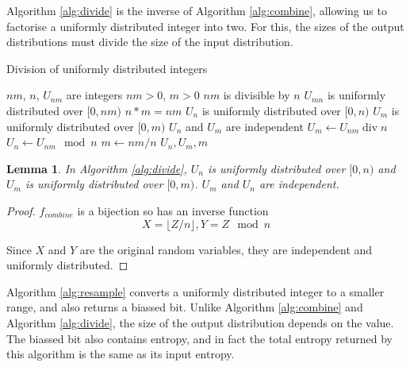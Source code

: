 \documentclass[12pt]{article}
\newtheorem{lemma}{Lemma}
\begin{document}
Algorithm \ref{alg:divide} is the inverse of Algorithm \ref{alg:combine}, allowing us to factorise a uniformly distributed integer into two. For this, the sizes of the output distributions must divide the size of the input distribution.

\begin{algorithm}
\caption{Division of uniformly distributed integers}
\label{alg:divide}
\begin{algorithmic}[1]
    \Require $nm$, $n$, $U_{nm}$ are integers
    \Require $nm>0$, $m>0$
    \Require $nm$ is divisible by $n$
    \Require $U_{mn}$ is uniformly distributed over $[0,nm)$
    \Ensure $n * m = nm$
    \Ensure $U_{n}$ is uniformly distributed over $[0,n)$
    \Ensure $U_{m}$ is uniformly distributed over $[0,m)$
    \Ensure $U_n$ and $U_m$ are independent
  \State $U_m \gets U_{nm} \operatorname{div} n$
  \State $U_{n} \gets U_{nm} \mod n$
  \State $m \gets nm / n$
  \State \Return $U_n, U_m, m$
\EndProcedure
\end{algorithmic}
\end{algorithm}

\begin{lemma}
In Algorithm \ref{alg:divide}, $U_n$ is uniformly distributed over $[0,n)$ and $U_m$ is uniformly distributed over $[0,m)$. $U_m$ and $U_n$ are independent.

\label{lem:divide}
\end{lemma}

\begin{proof} $f_{combine}$ is a bijection so has an inverse function 
\begin{equation}    
X = \lfloor Z/n \rfloor, Y = Z \mod n
\end{equation}

Since $X$ and $Y$ are the original random variables, they are independent and uniformly distributed.
\end{proof}

Algorithm \ref{alg:resample} converts a uniformly distributed integer to a smaller range, and also returns a biassed bit. Unlike Algorithm \ref{alg:combine} and Algorithm \ref{alg:divide}, the size of the output distribution depends on the value. The biassed bit also contains entropy, and in fact the total entropy returned by this algorithm is the same as its input entropy.
\end{document}
